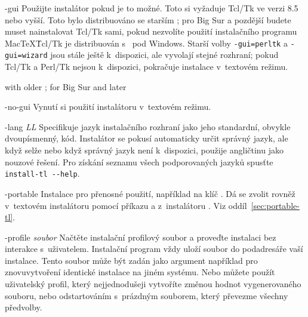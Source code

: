 \documentclass[\classoptions,slovak,english,czech]{\classname}
\begin{document}
\begin{ttdescription}
\item[-gui] Použijte \GUI{} instalátor pokud je to možné. Toto si vyžaduje
Tcl/Tk ve verzi 8.5 nebo vyšší. Toto bylo distribuováno se starším \macOS; pro Big Sur a pozdější
budete muset nainstalovat Tcl/Tk sami, pokud nezvolíte
použití instalačního programu Mac\TeX\. Tcl/Tk je 
distribuován s~\TL{} pod Windows. Starší volby \texttt{-gui=perltk} 
a \texttt{-gui=wizard} jsou stále ještě k~dispozici, ale vyvolají stejné \GUI{} rozhraní; 
pokud Tcl/Tk a Perl/Tk nejsou k~dispozici, pokračuje instalace 
v~textovém režimu.   

with older \macOS;
for Big Sur and later


\item[-no-gui] Vynutí si použití instalátoru v~textovém režimu.


\item[-lang {\sl LL}] Specifikuje jazyk instalačního rozhraní jako 
  jeho standardní, obvykle dvoupísmenný, kód. Instalátor se pokusí 
  automaticky určit správný jazyk, ale když selže nebo když správný jazyk není
  k~dispozici, použije angličtinu jako nouzové řešení. 
  Pro získání seznamu všech podporovaných jazyků spusťte
  \verb|install-tl --help|.

\item[-portable] Instalace pro přenosné použití, například na klíč \USB{}.
  Dá se zvolit rovněž v~textovém instalátoru pomocí příkazu 
  a z~instalátoru \GUI{}. Viz oddíl~\ref{sec:portable-tl}.

\item[-profile {\sl soubor}] Načtěte instalační profilový 
  soubor a proveďte instalaci bez interakce s~uživatelem.
  Instalační program vždy uloží soubor
   do podadresáře  vaší instalace.  
  Tento soubor může být zadán jako argument například pro znovuvytvoření
  identické instalace na jiném systému. Nebo můžete  
  použít uživatelský profil, který nejjednodušeji 
  vytvoříte změnou hodnot vygenerovaného
  souboru, nebo odstartováním s~prázdným souborem, 
  který převezme všechny předvolby.


\end{ttdescription}
\end{document}
